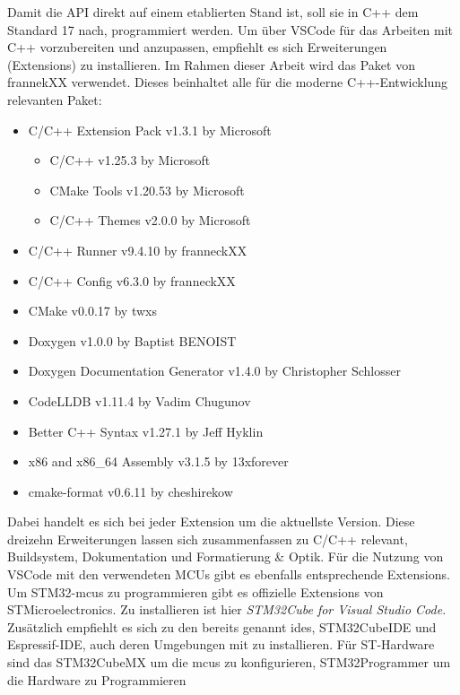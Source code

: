 Damit die API direkt auf einem etablierten Stand ist, soll sie in C++ dem Standard 17 nach, programmiert werden.
Um über VSCode für das Arbeiten mit C++ vorzubereiten und anzupassen, empfiehlt es sich Erweiterungen (Extensions) zu installieren.
Im Rahmen dieser Arbeit wird das Paket von frannekXX verwendet.
Dieses beinhaltet alle für die moderne C++-Entwicklung relevanten Paket:
\begin{itemize}
	\item C/C++ Extension Pack  v1.3.1 by Microsoft
	\begin{itemize}
		\item C/C++  v1.25.3  by Microsoft		
		\item CMake Tools  v1.20.53  by Microsoft
		\item C/C++ Themes  v2.0.0 by Microsoft 
	\end{itemize}
	\item C/C++ Runner  v9.4.10 by franneckXX
	\item C/C++ Config  v6.3.0 by franneckXX
	\item CMake  v0.0.17 by twxs
	\item Doxygen  v1.0.0 by Baptist BENOIST
	\item Doxygen Documentation Generator  v1.4.0 by Christopher Schlosser
	\item CodeLLDB  v1.11.4 by Vadim Chugunov
	\item Better C++ Syntax  v1.27.1  by Jeff Hyklin
	\item x86 and x86\_64 Assembly  v3.1.5 by 13xforever
	\item cmake-format  v0.6.11 by cheshirekow
\end{itemize}

Dabei handelt es sich bei jeder Extension um die aktuellste Version.
Diese dreizehn Erweiterungen lassen sich zusammenfassen zu C/C++ relevant, Buildsystem, Dokumentation und Formatierung \& Optik.
Für die Nutzung von VSCode mit den verwendeten MCUs gibt es ebenfalls entsprechende Extensions.
Um STM32-\gls{mcu}s zu programmieren gibt es offizielle Extensions von\\STMicroelectronics.
Zu installieren ist hier \emph{STM32Cube for Visual Studio Code}.
Zusätzlich empfiehlt es sich zu den bereits genannt \gls{ide}s, STM32CubeIDE und Espressif-IDE, auch deren Umgebungen mit zu installieren.
Für ST-Hardware sind das STM32CubeMX um die \gls{mcu}s zu konfigurieren, STM32Programmer um die Hardware zu Programmieren %

